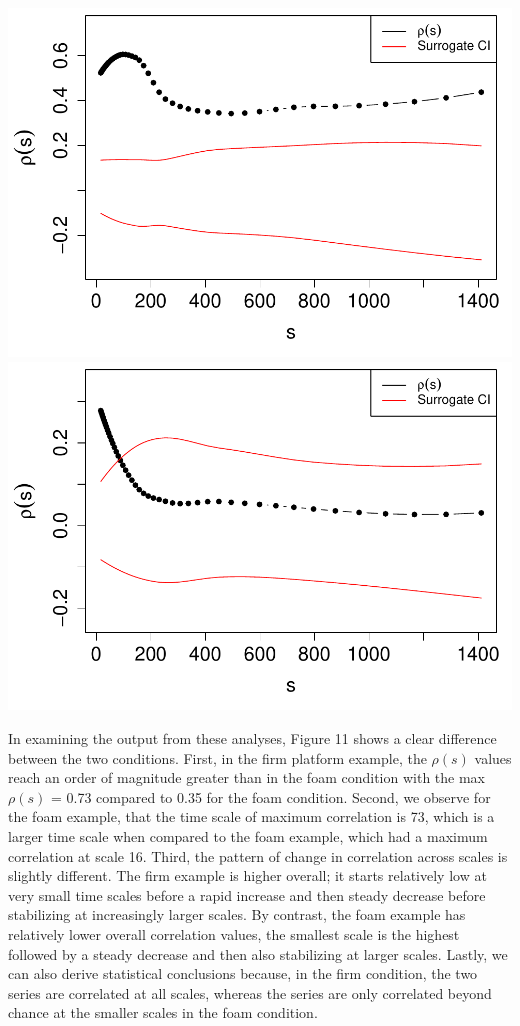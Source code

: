 \documentclass[
  man]{apa6}
\begin{document}
\includegraphics{fractal_regression_paper_brm_files/figure-latex/unnamed-chunk-22-1.pdf} \includegraphics{fractal_regression_paper_brm_files/figure-latex/unnamed-chunk-22-2.pdf}

In examining the output from these analyses, Figure 11 shows a clear
difference between the two conditions. First, in the firm platform
example, the \(\rho(s)\) values reach an order of magnitude greater than
in the foam condition with the max \(\rho(s)\) =
0.73 compared to
0.35 for the foam condition. Second, we
observe for the foam example, that the time scale of maximum correlation
is 73,
which is a larger time scale when compared to the foam example, which
had a maximum correlation at scale
16. Third,
the pattern of change in correlation across scales is slightly
different. The firm example is higher overall; it starts relatively low
at very small time scales before a rapid increase and then steady
decrease before stabilizing at increasingly larger scales. By contrast,
the foam example has relatively lower overall correlation values, the
smallest scale is the highest followed by a steady decrease and then
also stabilizing at larger scales. Lastly, we can also derive
statistical conclusions because, in the firm condition, the two series
are correlated at all scales, whereas the series are only correlated
beyond chance at the smaller scales in the foam condition.
\end{document}
